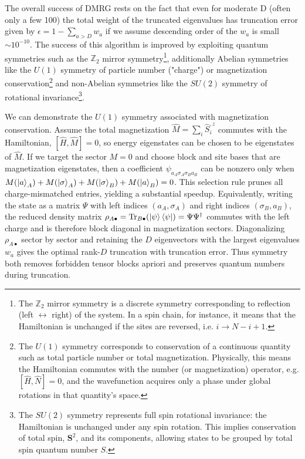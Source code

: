 \documentclass{article}
\begin{document}
\noindent The overall success of DMRG rests on the fact that even for moderate D (often only a few 100) the total weight of the truncated eigenvalues has truncation error given by $\epsilon = 1 - \sum_{a > D} w_a$ if we assume descending order of the $w_a$ is small $\sim 10^{-10}$. The success of this algorithm is improved by exploiting quantum symmetries such as the $\mathbb{Z}_2$ mirror symmetry\footnote{The $\mathbb{Z}_2$ mirror symmetry is a discrete symmetry corresponding to reflection (left $\leftrightarrow$ right) of the system. In a spin chain, for instance, it means that the Hamiltonian is unchanged if the sites are reversed, i.e. $i \rightarrow N - i + 1$.}, additionally Abelian symmetries like the $U(1)$ symmetry of particle number ("charge") or magnetization conservation\footnote{The $U(1)$ symmetry corresponds to conservation of a continuous quantity such as total particle number or total magnetization. Physically, this means the Hamiltonian commutes with the number (or magnetization) operator, e.g. $[\hat{H}, \hat{N}] = 0$, and the wavefunction acquires only a phase under global rotations in that quantity’s space.} and non-Abelian symmetries like the $SU(2)$ symmetry of rotational invariance\footnote{The $SU(2)$ symmetry represents full spin rotational invariance: the Hamiltonian is unchanged under any spin rotation. This implies conservation of total spin, $\mathbf{S}^2$, and its components, allowing states to be grouped by total spin quantum number $S$.}.


\vspace{1em}

\noindent We can demonstrate the $U(1)$ symmetry associated with magnetization conservation. Assume the total magnetization $\hat M=\sum_i \hat S_i^{,z}$ commutes with the Hamiltonian, $[\hat H,\hat M]=0$, so energy eigenstates can be chosen to be eigenstates of $\hat M$. If we target the sector $M=0$ and choose block and site bases that are magnetization eigenstates, then a coefficient $\psi_{a_A\sigma_A\sigma_B a_B}$ can be nonzero only when $M(\ket a_A)+M(\ket \sigma_A)+M(\ket \sigma_B)+M(\ket a_B)=0$. This selection rule prunes all charge-mismatched entries, yielding a substantial speedup. Equivalently, writing the state as a matrix $\Psi$ with left indices $(a_A,\sigma_A)$ and right indices $(\sigma_B,a_B)$, the reduced density matrix $\rho_{A\bullet}=\mathrm{Tr}_{B\bullet}(\ket\psi\bra\psi)=\Psi\Psi^\dagger$ commutes with the left charge and is therefore block diagonal in magnetization sectors. Diagonalizing $\rho_{A\bullet}$ sector by sector and retaining the $D$ eigenvectors with the largest eigenvalues $w_a$ gives the optimal rank-$D$ truncation with truncation error. Thus symmetry both removes forbidden tensor blocks apriori and preserves quantum numbers during truncation.
\end{document}
